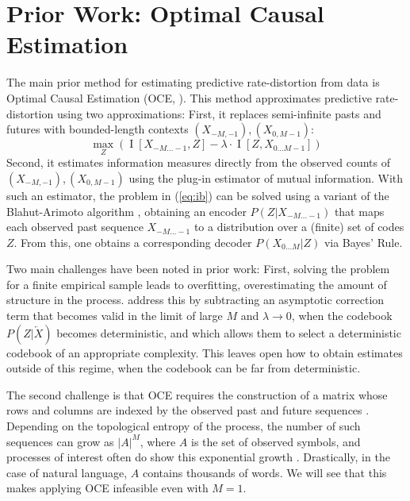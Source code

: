 \documentclass[11pt,letterpaper]{article}
\begin{document}



\section{Prior Work: Optimal Causal Estimation}\label{sec:oce}

The main prior method for estimating predictive rate-distortion from data is Optimal Causal Estimation (OCE, \citet{still-optimal-2010}).
This method approximates predictive rate-distortion using two approximations:
First, it replaces semi-infinite pasts and futures with bounded-length contexts $(X_{-M, -1}), (X_{0, M-1})$:
\begin{equation}\label{eq:ib-oce}
	\max_{Z} \left( \operatorname{I}[X_{-M\dots -1}, Z] - \lambda \cdot \operatorname{I}[Z, X_{0\dots M-1}] \right)
\end{equation}
Second, it estimates information measures directly from the observed counts of $(X_{-M, -1}), (X_{0, M-1})$ using the plug-in estimator of mutual information.
With such an estimator, the problem in (\ref{eq:ib}) can be solved using a variant of the Blahut-Arimoto algorithm \citep{tishby-information-1999}, obtaining an encoder $P(Z|X_{-M...-1})$ that maps each observed past sequence $X_{-M...-1}$ to a distribution over a (finite) set of codes $Z$. From this, one obtains a corresponding decoder $P(X_{0...M}|Z)$ via Bayes' Rule.

Two main challenges have been noted in prior work:
First, solving the problem for a finite empirical sample leads to overfitting, overestimating the amount of structure in the process.
\citet{still-optimal-2010} address this by subtracting an asymptotic correction term that becomes valid in the limit of large $M$ and $\lambda \rightarrow 0$, when the codebook $P(Z|\overleftarrow{X})$ becomes deterministic, and which allows them to select a deterministic codebook of an appropriate complexity.
This leaves open how to obtain estimates outside of this regime, when the codebook can be far from deterministic.

The second challenge is that OCE requires the construction of a matrix whose rows and columns are indexed by the observed past and future sequences \citep{marzen-predictive-2016}.
Depending on the topological entropy of the process, the number of such sequences can grow as $|A|^M$, where $A$ is the set of observed symbols, and processes of interest often do show this exponential growth \citep{marzen-predictive-2016}.
Drastically, in the case of natural language, $A$ contains thousands of words.
We will see that this makes applying OCE infeasible even with $M=1$.
\end{document}
